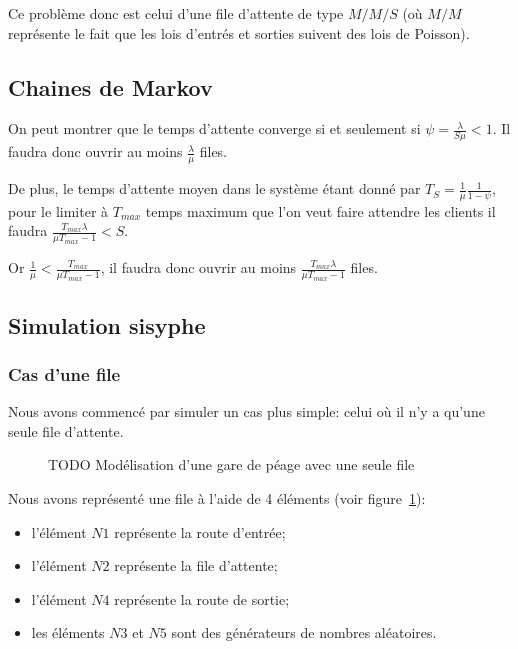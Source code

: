 \documentclass{scrartcl}
\begin{document}
  Ce problème donc est celui d'une file d'attente de type $M/M/S$ (où $M/M$
  représente le fait que les lois d'entrés et sorties suivent des lois de
  Poisson).

  \subsection{Chaines de Markov}
    On peut montrer que le temps d'attente converge si et seulement si $\psi =
    \frac \lambda {S\mu} < 1$. Il faudra donc ouvrir au moins $\frac \lambda
    \mu$ files.

    De plus, le temps d'attente moyen dans le système étant donné par $T_S =
    \frac 1 \mu \frac 1 {1-\psi}$, pour le limiter à $T_{max}$ temps maximum
    que l'on veut faire attendre les clients il faudra $\frac
    {T_{max}\lambda}{\mu T_{max}-1} < S$.

    Or $\frac 1 \mu < \frac{T_{max}}{\mu T_{max}-1}$, il faudra donc
    ouvrir au moins $\frac{T_{max}\lambda}{\mu T_{max}-1}$ files.

  \subsection{Simulation sisyphe}
    \subsubsection{Cas d'une file}
      Nous avons commencé par simuler un cas plus simple: celui où il n'y a
      qu'une seule file d'attente.

      \begin{figure}[htbp]
        \centering
        \caption{TODO Modélisation d'une gare de péage avec une seule file}
        \label{figure:syphilis_simple}
      \end{figure}

      Nous avons représenté une file à l'aide de 4 éléments (voir
      figure~\ref{figure:syphilis_simple}):
      \begin{itemize}
        \item l'élément $N1$ représente la route d'entrée;
        \item l'élément $N2$ représente la file d'attente;
        \item l'élément $N4$ représente la route de sortie;
        \item les éléments $N3$ et $N5$ sont des générateurs de nombres
          aléatoires.
      \end{itemize}
\end{document}
